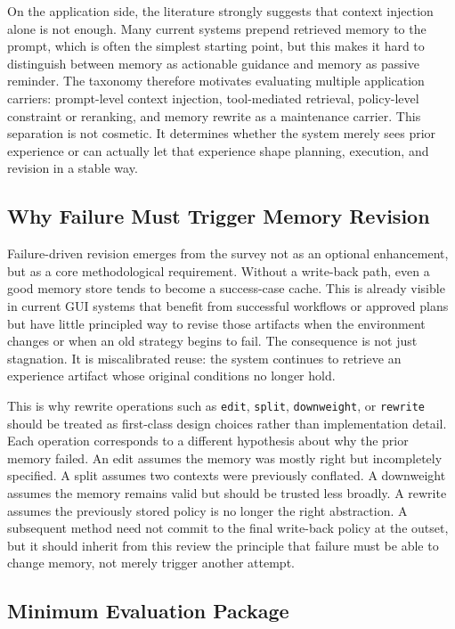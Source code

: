 \documentclass{article}
\begin{document}
On the application side, the literature strongly suggests that context
injection alone is not enough. Many current systems prepend retrieved
memory to the prompt, which is often the simplest starting point, but
this makes it hard to distinguish between memory as actionable guidance
and memory as passive reminder. The taxonomy therefore motivates
evaluating multiple application carriers: prompt-level context
injection, tool-mediated retrieval, policy-level constraint or
reranking, and memory rewrite as a maintenance carrier. This separation
is not cosmetic. It determines whether the system merely sees prior
experience or can actually let that experience shape planning,
execution, and revision in a stable way.

\subsection{Why Failure Must Trigger Memory Revision}\label{73-why-failure-must-trigger-memory-revision}

Failure-driven revision emerges from the survey not as an optional
enhancement, but as a core methodological requirement. Without a
write-back path, even a good memory store tends to become a success-case
cache. This is already visible in current GUI systems that benefit from
successful workflows or approved plans but have little principled way to
revise those artifacts when the environment changes or when an old
strategy begins to fail. The consequence is not just stagnation. It is
miscalibrated reuse: the system continues to retrieve an experience
artifact whose original conditions no longer hold.

This is why rewrite operations such as \texttt{edit}, \texttt{split},
\texttt{downweight}, or \texttt{rewrite} should be treated as
first-class design choices rather than implementation detail. Each
operation corresponds to a different hypothesis about why the prior
memory failed. An edit assumes the memory was mostly right but
incompletely specified. A split assumes two contexts were previously
conflated. A downweight assumes the memory remains valid but should be
trusted less broadly. A rewrite assumes the previously stored policy is
no longer the right abstraction. A subsequent method need not commit to
the final write-back policy at the outset, but it should inherit from
this review the principle that failure must be able to change memory,
not merely trigger another attempt.

\subsection{Minimum Evaluation Package}\label{74-minimum-evaluation-package}
\end{document}
